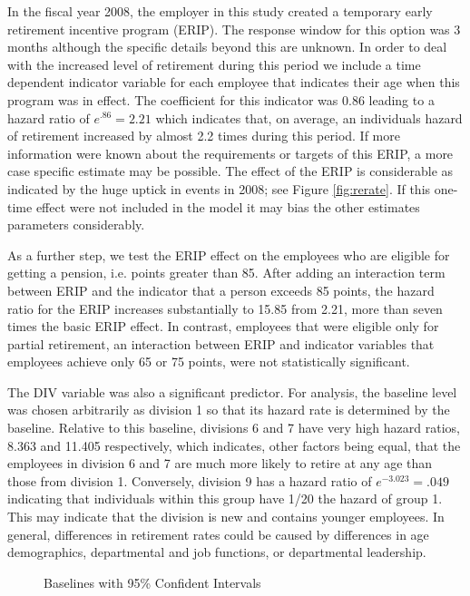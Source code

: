 \documentclass[12pt,letterpaper]{article}
\begin{document}
In the fiscal year 2008, the employer in this study created a temporary early retirement incentive program (ERIP). The response window for this option was 3 months although the specific details beyond this are unknown. In order to deal with the increased level of retirement during this period we include a time dependent indicator variable for each employee that indicates their age when this program was in effect.  The coefficient for this indicator was 0.86 leading to a hazard ratio of $e^{.86} = 2.21$ which indicates that, on average, an individuals hazard of retirement increased by almost 2.2 times during this period.  If more information were known about the requirements or targets of this ERIP, a more case specific estimate may be possible.  The effect of the ERIP is considerable as indicated by the huge uptick in events in 2008; see Figure \ref{fig:rerate}. If this one-time effect were not included in the model it may bias the other estimates parameters considerably.
	
As a further step, we test the ERIP effect on the employees who are eligible for getting a pension, i.e. points greater than 85. After adding an interaction term between ERIP and the indicator that a person exceeds 85 points, the hazard ratio for the ERIP increases substantially to 15.85 from 2.21, more than seven times the basic ERIP effect. In contrast, employees that were eligible only for partial retirement, an interaction between ERIP and indicator variables that employees achieve only 65 or 75 points, were not statistically significant.

The DIV variable was also a significant predictor.  For analysis, the baseline level was chosen arbitrarily as division 1 so that its hazard rate is determined by the baseline.  Relative to this baseline, divisions 6 and 7 have very high hazard ratios, 8.363 and 11.405 respectively, which indicates, other factors being equal, that the employees in division 6 and 7 are much more likely to retire at any age than those from division 1.  Conversely, division 9 has a hazard ratio of $e^{-3.023} = .049$ indicating that individuals within this group have 1/20 the hazard of group 1.  This may indicate that the division is new and contains younger employees.  In general, differences in retirement rates could be caused by differences in age demographics, departmental and job functions, or departmental leadership.
\begin{figure}[h!]
	\centering
	\caption{Baselines with 95\% Confident Intervals}
	\label{fig:basepred}
\end{figure}
\end{document}
